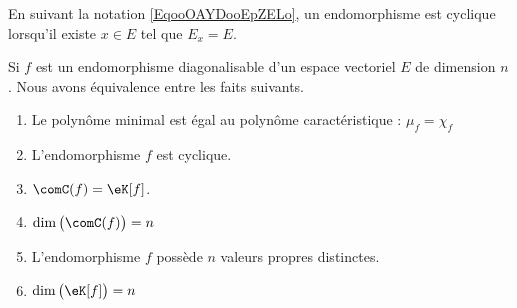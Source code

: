 En suivant la notation \eqref{EqooOAYDooEpZELo}, un endomorphisme est cyclique lorsqu'il existe \( x\in E\) tel que \( E_x=E\). 

\begin{proposition}      \label{PropooQALUooTluDif}
    Si \( f\) est un endomorphisme diagonalisable d'un espace vectoriel \( E\) de dimension \( n\). Nous avons équivalence entre les faits suivants.
    \begin{enumerate}
        \item\label{ITEMooSOYYooZVibjrii}
            Le polynôme minimal est égal au polynôme caractéristique : \( \mu_f=\chi_f\)
        \item\label{ITEMooSOYYooZVibjrvi}
            L'endomorphisme \( f\) est cyclique.
        \item\label{ITEMooSOYYooZVibjrv}
            \( \comC(f)=\eK[f]\).
        \item\label{ITEMooSOYYooZVibjriv}
            \( \dim\big( \comC(f) \big)=n\)
        \item\label{ITEMooSOYYooZVibjriii}
            L'endomorphisme \( f\) possède \( n\) valeurs propres distinctes.
        \item   \label{ITEMooSOYYooZVibjri}
            \( \dim\big( \eK[f] \big)=n\)
    \end{enumerate}
\end{proposition}

